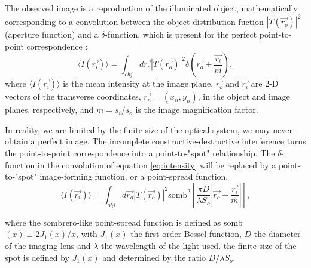 The observed image is a reproduction of the illuminated object, mathematically
corresponding to a convolution between the object distribution fuction $ |T(\vec{r_o})|^2$ (aperture function) 
and a $\delta$-function, which is present for the perfect
point-to-point correspondence \cite{introquantumoptics}:
\begin{equation}
\label{eq:intensity}
\langle I(\vec{r_i}) \rangle =\int_{obj} d\vec{r_o} |T(\vec{r_o})|^2 \delta(\vec{r_o}+\frac{\vec{r_i}}{m}),
\end{equation}
where $\langle I(\vec{r_i})\rangle $ is the mean intensity at the image plane, $\vec{r_o}$ and $\vec{r_i}$ are 2-D vectors of the
transverse coordinates, $\vec{r_n}= (x_n,y_n)$, in the object and image planes, respectively, and
$m=s_i/s_o$ is the image magnification factor.

In reality, we are limited by the finite size of the optical system, we may never obtain a perfect image.
The incomplete constructive-destructive interference turns the point-to-point correspondence into 
 a point-to-"spot" relationship. The $\delta$-function in the convolution of equation \ref{eq:intensity}
will be replaced by a point-to-"spot" image-forming function, or a point-spread function,
\begin{equation}
\label{eq:realIntensity}
\langle I(\vec{r_i}) \rangle =\int_{obj} d\vec{r_o} |T(\vec{r_o})|^2 \text{somb}^2[\frac{\pi D}{\lambda S_o} | \vec{r_o}+\frac{\vec{r_i}}{m}|],
\end{equation}

where the sombrero-like point-spread function is defined as 
somb$(x) \equiv  2J_1(x)/x$, with $J_1(x)$ the first-order Bessel function, $D$ the diameter of the imaging lens and $\lambda$ the wavelength of the light used.
the finite size of the spot is defined by $J_1(x)$ and 
determined by the ratio $D / \lambda S_o$.
   

